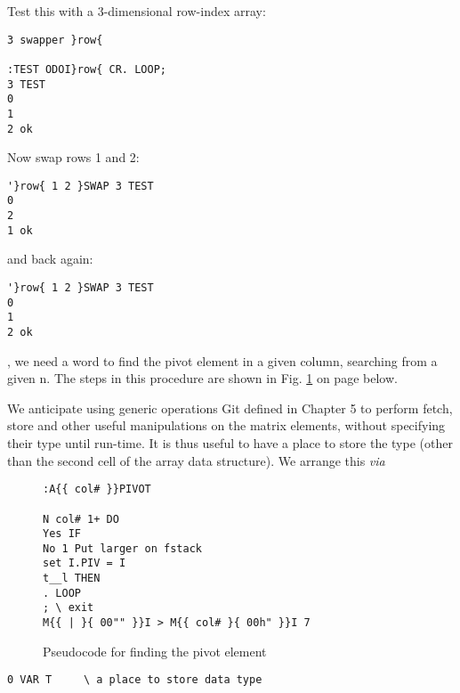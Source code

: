 Test this with a 3-dimensional row-index array:

\begin{verbatim}
3 swapper }row{

:TEST ODOI}row{ CR. LOOP;
3 TEST
0
1
2 ok
\end{verbatim}

Now swap rows 1 and 2:

\begin{verbatim}
'}row{ 1 2 }SWAP 3 TEST
0
2
1 ok
\end{verbatim}
and back again:
\begin{verbatim}
'}row{ 1 2 }SWAP 3 TEST
0
1
2 ok
\end{verbatim} 

, we need a word to find the pivot element in a given
column, searching from a given n. The steps in this procedure
are shown in Fig. \ref{fig:09_02} on page \pageref{fig:09_02} below.

We anticipate using generic operations Git defined in Chapter 5 
to perform fetch, store and other useful manipulations on the
matrix elements, without specifying their type until run-time. It
is thus useful to have a place to store the type (other than the
second cell of the array data structure). We arrange this \textit{via}

\begin{figure}
\begin{verbatim}
:A{{ col# }}PIVOT

N col# 1+ DO
Yes IF
No 1 Put larger on fstack
set I.PIV = I
t__l THEN
. LOOP
; \ exit
M{{ | }{ 00"" }}I > M{{ col# }{ 00h" }}I 7 
\end{verbatim}
    \caption{Pseudocode for finding the pivot element}
	\label{fig:09_02}
\end{figure}



\begin{verbatim}
0 VAR T		\ a place to store data type
\end{verbatim}

